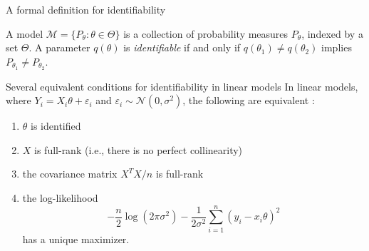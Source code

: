 \documentclass[aspectratio=169]{beamer}
\theoremstyle{remark}
\begin{document}
\appendix

\begin{frame}{A formal definition for identifiability}
    \begin{definition}
        A model $\mathcal M = \{ P_\theta : \theta \in \Theta \}$ is a collection of probability measures $P_\theta$, indexed by a set $\Theta$. A parameter $q(\theta)$ is \emph{identifiable} if and only if $q(\theta_1) \neq q(\theta_2)$ implies $P_{\theta_1} \neq P_{\theta_2}$.
    \end{definition}
\end{frame}

\begin{frame}{Several equivalent conditions for identifiability in linear models}
    In linear models, where $Y_i = X_i \theta + \varepsilon_i$ and $\varepsilon_i \sim \mathcal N(0, \sigma^2)$, the following are equivalent \citep{lewbel2019}:
    \begin{enumerate}
        \item $\theta$ is identified
        \item $X$ is full-rank (i.e., there is no perfect collinearity)
        \item the covariance matrix $X^T X / n$ is full-rank
        \item the log-likelihood
              \[
                  -\frac{n}{2}\log(2\pi\sigma^2) - \frac{1}{2\sigma^2}\sum_{i=1}^n(y_i - x_i\theta)^2
              \]
              has a unique maximizer.
    \end{enumerate}
\end{frame}
\end{document}
